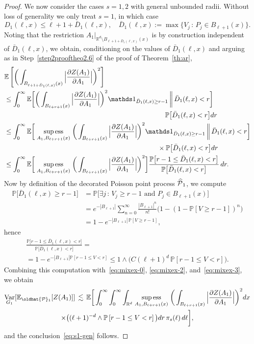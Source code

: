 \documentclass[10pt]{amsart}
\theoremstyle{definition}\newtheorem{defi}[theo]{Definition}\newtheorem{rema}[theo]{Remark}\newtheorem{exam}[theo]{Example}\newtheorem{exem}[theo]{Example}\newtheorem{nota}[theo]{Notation}
\newcommand{\R}{\mathbb R}
\newcommand{\E}{\mathbb{E}}
\newcommand{\expecM}[1]{\mathbb{E}\bigg[#1 \bigg]}
\newcommand{\expec}[1]{\mathbb{E}\left[#1 \right]}
\newcommand{\pr}[1]{\mathbb{P}\left[#1 \right]}
\newcommand{\prm}[1]{\mathbb{P}\big[#1 \big]}
\newcommand{\expeCM}[2]{\mathbb{E}\bigg[#1 \,\bigg\|\,#2\bigg]}
\newcommand{\Pc}{\mathcal P}
\DeclareMathOperator{\Var}{Var}
\DeclareMathOperator{\supess}{sup\,ess}
\newcommand{\supessd}[1]{\mathrel{\mathop{\supess}\limits_{#1}}}
\renewcommand*{\hat}[1]{\mathchoice{\widehat{#1}}{\widehat{#1}}{\oldhat{#1}}{\oldhat{#1}}}\let\oldexists\exists
\renewcommand*{\exists}{\mathrel{\oldexists}}
\begin{document}
\begin{proof}
\noindent We now consider the cases $s=1,2$ with general unbounded radii. Without loss of generality we only treat $s=1$, in which case
\[
D_1(\ell,x)\le\ell+1+\bar D_1(\ell,x),\quad \bar D_1(\ell,x):=\max\big\{V_j\,:\,P_j\in B_{\ell+1}(x)\big\}.
\]
Noting that the restriction $A_1|_{\R^d\setminus B_{\ell+1+\bar D_1(\ell,x)}(x)}$ is by construction independent of $\bar D_1(\ell,x)$, we obtain, conditioning on the values of $\bar D_1(\ell,x)$ and arguing as in Step~\ref{step2prooftheo2.6} of the proof of Theorem~\ref{th:ar},
\begin{equation}\label{eq:mixex-3}
\begin{aligned}
&\lefteqn{\expec{\bigg(\int_{B_{\ell+1+\bar D_1(\ell,x)}(x)}\Big|\frac{\partial Z(A_1)}{\partial A_1}\Big|\bigg)^2}}\\
&\le \int_0^\infty \expeCM{\bigg(\int_{B_{\ell+r+1}(x)}\Big|\frac{\partial Z(A_1)}{\partial A_1}\Big|\bigg)^2\mathds1_{\bar D_1(\ell,x)\ge r-1}}{\bar D_1(\ell,x)<r}\\
&\mkern430mu \prm{\bar D_1(\ell,x)<r}dr\\
&\le \int_0^\infty \expeCM{\supessd{A_1,B_{\ell+r+1}(x)}\bigg(\int_{B_{\ell+r+1}(x)}\Big|\frac{\partial Z(A_1)}{\partial A_1}\Big|\bigg)^2\mathds1_{\bar D_1(\ell,x)\ge r-1}}{\bar D_1(\ell,x)<r}\\
&\mkern410mu\times\prm{\bar D_1(\ell,x)<r}dr\\
&\le\int_0^\infty\expecM{\supessd{A_1,B_{\ell+r+1}(x)}\bigg(\int_{B_{\ell+r+1}(x)}\Big|\frac{\partial Z(A_1)}{\partial A_1}\Big|\bigg)^2}\frac{\prm{r-1\le\bar D_1(\ell,x)<r}}{\prm{\bar D_1(\ell,x)<r}}\,dr.
\end{aligned}
\end{equation}
Now by definition of the decorated Poisson point process $\hat\Pc_1$, we compute
\begin{align*}
\prm{\bar D_1(\ell,x)\ge r-1}&=\prm{\exists j \,:\, V_j\ge r-1\text{ and }P_j\in B_{\ell+1}(x)}\\
&=e^{-|B_{\ell+1}|}\sum_{n=0}^\infty \frac{|B_{\ell+1}|^n}{n!}\big(1-(1-\pr{V\ge r-1})^n\big)\\
&=1-e^{-|B_{\ell+1}|\,\pr{V\ge r-1}},
\end{align*}
hence
\begin{multline*}
\frac{\prm{r-1\le\bar D_1(\ell,x)<r}}{\prm{\bar D_1(\ell,x)<r}}=\\
=1-e^{-|B_{\ell+1}|\pr{r-1\le V<r}}\le 1\wedge\big(C(\ell+1)^d\,\pr{r-1\le V<r}\big).
\end{multline*}
Combining this computation with~\eqref{eq:mixex-0}, \eqref{eq:mixex-2}, and~\eqref{eq:mixex-3}, we obtain
\begin{multline*}
\Var_{G_1}[\E_{\hat\Pc_1}[Z(A_1)]]
\,\lesssim\, \E\bigg[\int_0^\infty\int_0^\infty\int_{\R^d}\supessd{A_1,B_{\ell+r+1}(x)}\bigg(\int_{B_{\ell+r+1}(x)}\Big|\frac{\partial Z(A_1)}{\partial A_1}\Big|\bigg)^2dx\\
\times\big((\ell+1)^{-d}\wedge\pr{r-1\le V<r}\big)dr\,\pi_s(\ell)\,d\ell\bigg],
\end{multline*}
and the conclusion~\eqref{eq:s1-gen} follows.


\end{proof}
\end{document}
